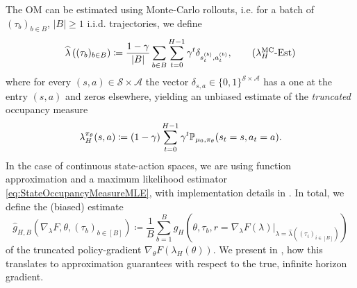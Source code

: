 \documentclass{article}
\theoremstyle{plain}
\theoremstyle{definition}
\theoremstyle{remark}
\def\PP{{\mathbb{P}}}
\def\SS{{\mathcal{S}}}
\def\AA{{\mathcal{A}}}
\newcommand{\card}[1]{\left|#1\right|}
\DeclarePairedDelimiter{\paren}{(}{)}
\newcommand{\define}{\coloneqq}
\def\lambdaHat{{\widehat{\lambda}}}
\def\ss{{s}}
\newcommand{\setm}[1]{[#1]}
\def\gApprox{{\hat{g}}}
\def\aa{{a}}
\def\ss{{s}}
\def\rew{{r}}
\begin{document}
The OM can be estimated using Monte-Carlo rollouts, i.e. for a batch of
$(\tau_b)_{b \in B}$, $\card{B} \geq 1$ i.i.d. trajectories, we define
\begin{align}
 \lambdaHat\left((\tau_b)_{b\in B}\right)
 \define \frac{1-\gamma}{\card{B}} \sum_{b\in B}\sum_{t=0}^{H-1} \gamma^t
 \delta_{\ss^{(b)}_t, \aa^{(b)}_t},
 \tag{$\lambda^{\mathrm{MC}}_H$-Est}
 \label{eq:StateOccupancyMeasureMonteCarloEstimate}
\end{align}
where for every $(\ss, \aa) \in \SS \times \AA$
the vector $\delta_{\ss, \aa} \in \{0,1\}^{\SS \times \AA}$
has a one at the entry $(\ss, \aa)$ and zeros elsewhere,
yielding an unbiased estimate of the \emph{truncated}
occupancy measure
\begin{align*}
 \lambda_H^{\pi_\theta}(\ss, \aa)
 \define (1-\gamma)\sum_{t=0}^{H-1} \gamma^t
 \PP_{\mu_0, \pi_{\theta}}\paren{\ss_t = \ss, \aa_t = \aa}.
\end{align*}
In the case of continuous state-action spaces, we
are using function approximation and a maximum likelihood
estimator \eqref{eq:StateOccupancyMeasureMLE}, with
implementation details in .
In total, we define the (biased) estimate
\begin{equation}
 \gApprox_{H,B}(\nabla_{\lambda} F, \theta, (\tau_b)_{b\in\setm{B}})
 \define \frac{1}{B} \sum_{b=1}^{B} g_H\left(\theta, \tau_b,
 \rew = \nabla_\lambda F(\lambda)\big\vert_{\lambda =
  \lambdaHat((\tau_i)_{i \in \setm{B}})}\right)
 \tag{$\nabla_\theta$-Est} \label{eq:SubGradientEstimator}
\end{equation}
of the truncated policy-gradient
\(\nabla_\theta F(\lambda_H(\theta))\).
We present in , how this translates to approximation
guarantees with respect to the true, infinite horizon gradient.
\end{document}
